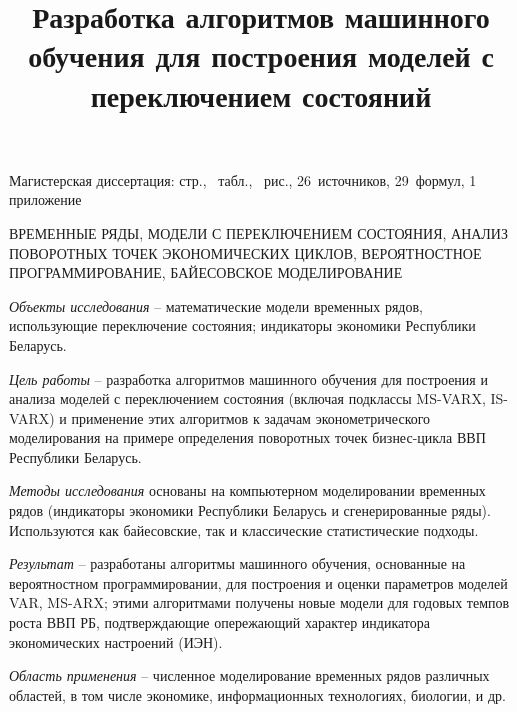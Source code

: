 \documentclass[a4paper,14pt]{extreport}
\title{Разработка алгоритмов машинного обучения для построения моделей с переключением состояний}
\author{\@authorlast \@authorfirst}
\newcommand{\totalreferences}{26}
\newcommand{\totalformulas}{29}
\begin{document}
\maketitle




Магистерская диссертация: \pageref{LastPage} стр., \totaltables\ табл., \totalfigures\ рис., \totalreferences\ источников, \totalformulas\ формул, 1 приложение

\MakeUppercase{временные ряды, модели с переключением состояния, анализ поворотных точек экономических циклов, вероятностное программирование, байесовское моделирование}

\textit{Объекты исследования} -- математические модели временных рядов, использующие переключение состояния; индикаторы экономики Республики Беларусь.

\textit{Цель работы} -- разработка алгоритмов машинного обучения для построения и анализа моделей с переключением состояния (включая подклассы MS-VARX, IS-VARX) и применение этих алгоритмов к задачам эконометрического моделирования на примере определения поворотных точек бизнес-цикла ВВП Республики Беларусь.

\textit{Методы исследования} основаны на компьютерном моделировании временных рядов (индикаторы экономики Республики Беларусь и сгенерированные ряды). Используются как байесовские, так и классические статистические подходы.

\textit{Результат} -- разработаны алгоритмы машинного обучения, основанные на вероятностном программировании, для построения и оценки параметров моделей VAR, MS-ARX; этими алгоритмами получены новые модели для годовых темпов роста ВВП РБ, подтверждающие опережающий характер индикатора экономических настроений (ИЭН). 

\textit{Область применения} -- численное моделирование временных рядов различных областей, в том числе экономике, информационных технологиях, биологии, и др.
\end{document}
